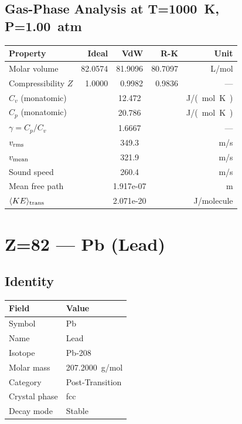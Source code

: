 \documentclass[11pt,a4paper]{article}
\begin{document}
\subsection{Gas-Phase Analysis at T=\SI{1000}{K}, P=\SI{1.00}{atm}}
\begin{tabular}{lrrrr}
  \toprule
  Property & Ideal & VdW & R-K & Unit \\
  \midrule
  Molar volume & 82.0574 & 81.9096 & 80.7097 & \si{L/mol} \\
  Compressibility $Z$ & 1.0000 & 0.9982 & 0.9836 & --- \\
  \midrule
  $C_v$ (monatomic) & \multicolumn{3}{c}{12.472} & \si{J/(mol.K)} \\
  $C_p$ (monatomic) & \multicolumn{3}{c}{20.786} & \si{J/(mol.K)} \\
  $\gamma = C_p/C_v$ & \multicolumn{3}{c}{1.6667} & --- \\
  $v_{\rm rms}$ & \multicolumn{3}{c}{349.3} & \si{m/s} \\
  $v_{\rm mean}$ & \multicolumn{3}{c}{321.9} & \si{m/s} \\
  Sound speed & \multicolumn{3}{c}{260.4} & \si{m/s} \\
  Mean free path & \multicolumn{3}{c}{1.917e-07} & \si{m} \\
  $\langle KE \rangle_{\rm trans}$ & \multicolumn{3}{c}{2.071e-20} & \si{J/molecule} \\
  \bottomrule
\end{tabular}

\newpage

\section{Z=82 --- Pb (Lead)}
\label{sec:Z82}

\subsection{Identity}
\begin{tabular}{ll}
  \toprule
  Field & Value \\
  \midrule
  Symbol & Pb \\
  Name & Lead \\
  Isotope & Pb-208 \\
  Molar mass & \SI{207.2000}{g/mol} \\
  Category & Post-Transition \\
  Crystal phase & fcc \\
  Decay mode & Stable \\
  \bottomrule
\end{tabular}
\end{document}
